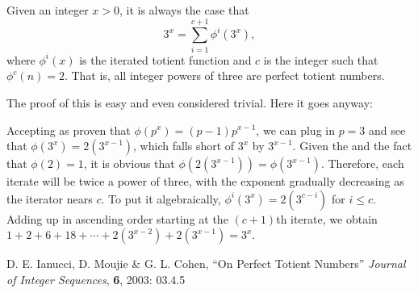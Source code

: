 \documentclass[12pt]{article}
\begin{document}
Given an integer $x > 0$, it is always the case that $$3^x = \sum_{i = 1}^{c + 1} \phi^i(3^x),$$ where $\phi^i(x)$ is the iterated totient function and $c$ is the integer such that $\phi^c(n) = 2$. That is, all integer powers of three are perfect totient numbers.

The proof of this is easy and even considered trivial. Here it goes anyway:

Accepting as proven that $\phi(p^x) = (p - 1)p^{x - 1}$, we can plug in $p = 3$ and see that $\phi(3^x) = 2(3^{x - 1})$, which falls short of $3^x$ by $3^{x - 1}$. Given the  and the fact that $\phi(2) = 1$, it is obvious that $\phi(2(3^{x - 1})) = \phi(3^{x - 1})$. Therefore, each iterate will be twice a power of three, with the exponent gradually decreasing as the iterator nears $c$. To put it algebraically, $\phi^i(3^x) = 2(3^{c - i})$ for $i \le c$. Adding up in ascending order starting at the $(c + 1)$th iterate, we obtain $1 + 2 + 6 + 18 + \cdots + 2(3^{x - 2}) + 2(3^{x - 1}) = 3^x$.

\begin{thebibliography}{2}
 D. E. Ianucci, D. Moujie \& G. L. Cohen, ``On Perfect Totient Numbers'' {\it Journal of Integer Sequences}, {\bf 6}, 2003: 03.4.5
\end{thebibliography}
\end{document}
